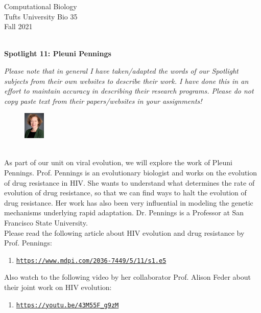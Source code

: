 \documentclass{article}
\begin{document}
\BeginAccSupp{}
\begin{flushright}
Computational Biology ~\\
Tufts University Bio 35 ~\\
Fall 2021 ~\\ ~\\
\end{flushright}
\begin{center}{\textbf{\Large{Spotlight 11: Pleuni Pennings}}}\end{center}

\textit{Please note that in general I have taken/adapted the words of our Spotlight subjects from their own websites to describe their work. I have done this in an effort to maintain accuracy in describing their research programs. Please do not copy paste text from their papers/websites in your assignments!}

\begin{figure}
\begin{center}
 \includegraphics[width=0.09\textwidth]{images/pleuni-pennings.jpeg}
 \end{center}
\end{figure}
~\\ As part of our unit on viral evolution, we will explore the work of Pleuni Pennings. Prof. Pennings is an evolutionary biologist and works on the evolution of drug resistance in HIV. She wants to understand what determines the rate of evolution of drug resistance, so that we can find ways to halt the evolution of drug resistance. Her work has also been very influential in modeling the genetic mechanisms underlying rapid adaptation. Dr. Pennings is a Professor at San Francisco State University.
~\\ 

Please read the following article about HIV evolution and drug resistance by Prof. Pennings: 
\begin{enumerate}
\item \texttt{\href{https://www.mdpi.com/2036-7449/5/11/s1.e5}{https://www.mdpi.com/2036-7449/5/11/s1.e5}}
\end{enumerate}

Also watch to the following video by her collaborator Prof. Alison Feder about their joint work on HIV evolution:
\begin{enumerate}
\item \texttt{\href{https://youtu.be/43M55F_g9zM}{https://youtu.be/43M55F\_g9zM}}
\end{enumerate}
\end{document}
